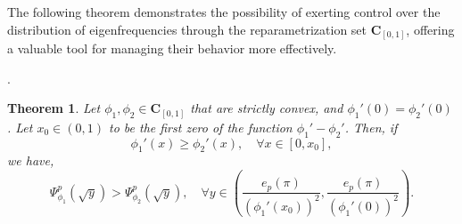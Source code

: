 \documentclass[11pt]{article}
\newtheorem{theorem}{Theorem}[section]
\begin{document}
The following theorem demonstrates the possibility of exerting control over the distribution of eigenfrequencies through the reparametrization set $\mathbf{C}_{[0,1]}$, offering a valuable tool for managing their behavior more effectively.

.




\begin{theorem} \label{dis1}
Let $\phi_1, \phi_2 \in \mathbf{C}_{[0,1]}$ that are strictly convex, and  $\phi_1'(0) = \phi_2'(0)$. Let $x_0 \in (0, 1)$ to be the first zero of the function $\phi_1' - \phi_2'$. Then, if $$\phi_1'(x) \geq \phi_2'(x),\quad \forall x \in [0, x_0], $$ we have, 
$$ 
\Psi_{\phi_1}^{p}(\sqrt{y}) > \Psi_{\phi_2}^{p}(\sqrt{y}), \quad \forall y \in\left(\frac{e_p(\pi)}{(\phi_1'(x_0))^2}, \frac{e_p(\pi)}{(\phi_1'(0))^2}\right).
$$
\end{theorem}
\end{document}
